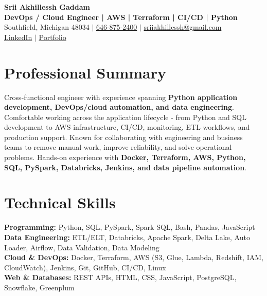 \documentclass[letterpaper,10pt]{article}
\begin{document}
\fontsize{9.35pt}{10.45pt}\selectfont

\begin{center}
    {\LARGE \textbf{Srii Akhillessh Gaddam}} \\[-1pt]
    \textbf{DevOps / Cloud Engineer | AWS | Terraform | CI/CD | Python} \\[2pt]
    Southfield, Michigan 48034 $|$
    \href{tel:6468752400}{646-875-2400} $|$
    \href{mailto:sriiakhillessh@gmail.com}{sriiakhillessh@gmail.com} \\[1pt]
    \href{https://www.linkedin.com/in/srii-akhiilessh-gaddam-b48668191/}{LinkedIn} $|$
    \href{https://sriiakhillesshg.github.io/portfolio/}{Portfolio}
\end{center}
\vspace{-8pt}

\section{Professional Summary}
\small{Cross-functional engineer with experience spanning \textbf{Python application development, DevOps/cloud automation, and data engineering}. Comfortable working across the application lifecycle - from Python and SQL development to AWS infrastructure, CI/CD, monitoring, ETL workflows, and production support. Known for collaborating with engineering and business teams to remove manual work, improve reliability, and solve operational problems. Hands-on experience with \textbf{Docker, Terraform, AWS, Python, SQL, PySpark, Databricks, Jenkins, and data pipeline automation}.}

\section{Technical Skills}
\small{
\textbf{Programming:} Python, SQL, PySpark, Spark SQL, Bash, Pandas, JavaScript \\
\textbf{Data Engineering:} ETL/ELT, Databricks, Apache Spark, Delta Lake, Auto Loader, Airflow, Data Validation, Data Modeling \\
\textbf{Cloud \& DevOps:} Docker, Terraform, AWS (S3, Glue, Lambda, Redshift, IAM, CloudWatch), Jenkins, Git, GitHub, CI/CD, Linux \\
\textbf{Web \& Databases:} REST APIs, HTML, CSS, JavaScript, PostgreSQL, Snowflake, Greenplum
}
\end{document}
